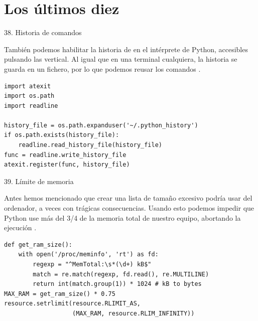\documentclass[14pt]{beamer}
\begin{document}
\section{Los últimos diez}









\begin{frame}[fragile]{38. Historia de comandos}
  \small
  \begin{block}{}
    \centering
    También podemos habilitar la historia de  en el intérprete de Python, accesibles pulsando
    las  vertical. Al igual que en una
    terminal cualquiera, la historia se guarda en un fichero, por lo
    que podemos reusar los comandos .
  \end{block}

  \footnotesize
  \begin{exampleblock}{}
    \begin{lstlisting}
import atexit
import os.path
import readline

history_file = os.path.expanduser('~/.python_history')
if os.path.exists(history_file):
    readline.read_history_file(history_file)
func = readline.write_history_file
atexit.register(func, history_file)
    \end{lstlisting}
  \end{exampleblock}
\end{frame}

\begin{frame}[fragile]{39. Límite de memoria}
  \small
  \begin{block}{}
    \centering
    Antes hemos mencionado que crear una lista de tamaño excesivo
    podría usar  del ordenador, a veces con
    trágicas consecuencias. Usando esto podemos impedir que Python use
    más del 3/4 de la memoria total de nuestro equipo, abortando la
    ejecución .
  \end{block}

  \scriptsize
  \begin{exampleblock}{}
    \begin{lstlisting}
def get_ram_size():
    with open('/proc/meminfo', 'rt') as fd:
        regexp = "^MemTotal:\s*(\d+) kB$"
        match = re.match(regexp, fd.read(), re.MULTILINE)
        return int(match.group(1)) * 1024 # kB to bytes
MAX_RAM = get_ram_size() * 0.75
resource.setrlimit(resource.RLIMIT_AS,
                   (MAX_RAM, resource.RLIM_INFINITY))
    \end{lstlisting}
  \end{exampleblock}
\end{frame}
\end{document}
